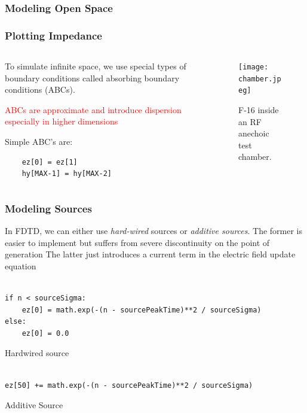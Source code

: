 \documentclass[10pt]{beamer}
\begin{document}
\begin{frame}[fragile]
    \frametitle{Modeling Open Space}
    \frametitle{Plotting Impedance}
    \begin{columns}[T] %
        \begin{column}{.4\textwidth}

            To simulate infinite space, we use special types of boundary conditions called absorbing boundary conditions (ABCs).

            \textcolor{red}{ABCs are approximate and introduce dispersion especially in higher dimensions}

            Simple ABC's are:
            \begin{verbatim}
    ez[0] = ez[1] 
    hy[MAX-1] = hy[MAX-2]
\end{verbatim}
        \end{column}
        \begin{column}[T]{.6\textwidth}
            \begin{figure}
                \centering
                \texttt{[image: chamber.jpeg]}
                \caption{F-16 inside an RF anechoic test chamber.}
            \end{figure}
        \end{column}%
    \end{columns}

\end{frame}

\begin{frame}[fragile]
    \frametitle{Modeling Sources}

    \begin{outline}
        \1  In FDTD, we can either use \textit{hard-wired} sources or \textit{additive sources}.
        \1 The former is easier to implement but suffers from severe discontinuity on the point of generation
        \1 The latter just introduces a current term in the electric field update equation
    \end{outline}

    \scriptsize
    \begin{verbatim}
            
if n < sourceSigma:
    ez[0] = math.exp(-(n - sourcePeakTime)**2 / sourceSigma)
else:
    ez[0] = 0.0
            \end{verbatim}
    \centering
    Hardwired source
    \scriptsize
    \begin{verbatim}
            
ez[50] += math.exp(-(n - sourcePeakTime)**2 / sourceSigma)
            \end{verbatim}
    \centering
    Additive Source

\end{frame}
\end{document}
